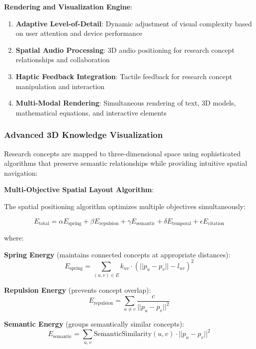 \documentclass[10pt,twocolumn]{article}
\begin{document}
\textbf{Rendering and Visualization Engine}:
\begin{enumerate}
    \item \textbf{Adaptive Level-of-Detail}: Dynamic adjustment of visual complexity based on user attention and device performance
    \item \textbf{Spatial Audio Processing}: 3D audio positioning for research concept relationships and collaboration
    \item \textbf{Haptic Feedback Integration}: Tactile feedback for research concept manipulation and interaction
    \item \textbf{Multi-Modal Rendering}: Simultaneous rendering of text, 3D models, mathematical equations, and interactive elements
\end{enumerate}

\subsubsection{Advanced 3D Knowledge Visualization}

Research concepts are mapped to three-dimensional space using sophisticated algorithms that preserve semantic relationships while providing intuitive spatial navigation:

\textbf{Multi-Objective Spatial Layout Algorithm}:

The spatial positioning algorithm optimizes multiple objectives simultaneously:

\begin{equation}
E_{\text{total}} = \alpha E_{\text{spring}} + \beta E_{\text{repulsion}} + \gamma E_{\text{semantic}} + \delta E_{\text{temporal}} + \epsilon E_{\text{citation}}
\end{equation}

where:

\textbf{Spring Energy} (maintains connected concepts at appropriate distances):
\begin{equation}
E_{\text{spring}} = \sum_{(u,v) \in E} k_{uv} \cdot (||p_u - p_v|| - l_{uv})^2
\end{equation}

\textbf{Repulsion Energy} (prevents concept overlap):
\begin{equation}
E_{\text{repulsion}} = \sum_{u \neq v} \frac{c}{||p_u - p_v||^2}
\end{equation}

\textbf{Semantic Energy} (groups semantically similar concepts):
\begin{equation}
E_{\text{semantic}} = \sum_{u,v} \text{SemanticSimilarity}(u,v) \cdot ||p_u - p_v||^2
\end{equation}
\end{document}
